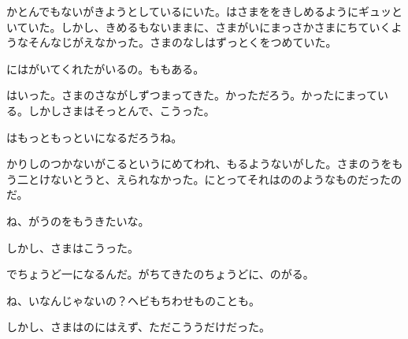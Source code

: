 かとんでもないがきようとしているにいた。はさまををきしめるようにギュッといていた。しかし、きめるもないままに、さまがいにまっさかさまにちていくようなそんなじがえなかった。さまのなしはずっとくをつめていた。

にはがいてくれたがいるの。ももある。

はいった。さまのさながしずつまってきた。かっただろう。かったにまっている。しかしさまはそっとんで、こうった。

はもっともっといになるだろうね。

かりしのつかないがこるというにめてわれ、もるようないがした。さまのうをもう二とけないとうと、えられなかった。にとってそれはののようなものだったのだ。

ね、がうのをもうきたいな。

しかし、さまはこうった。

でちょうど一になるんだ。がちてきたのちょうどに、のがる。

ね、いなんじゃないの？ヘビもちわせものことも。

しかし、さまはのにはえず、ただこううだけだった。

